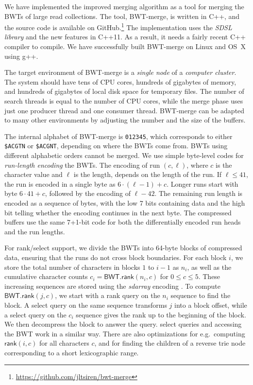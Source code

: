\documentclass[smallabstract,smallcaptions]{dccpaper}
\newcommand{\BWT}{\textsf{BWT}}
\newcommand{\mBWT}{\ensuremath{\mathsf{BWT}}}
\newcommand{\rank}{\textsf{rank}}
\newcommand{\select}{\textsf{select}}
\newcommand{\mrank}{\ensuremath{\mathsf{rank}}}
\newcommand{\BWTmerge}{\textsf{BWT\nobreakdash-merge}}
\begin{document}

We have implemented the improved merging algorithm as a tool for merging the \BWT{}s of large read collections. The tool, \BWTmerge{}, is written in C++, and the source code is available on GitHub.\footnote{\url{https://github.com/jltsiren/bwt-merge}} The implementation uses the \emph{SDSL library} \cite{Gog2014b} and the new features in C++11. As a result, it needs a fairly recent C++ compiler to compile. We have successfully built \BWTmerge{} on Linux and OS~X using g++.

The target environment of \BWTmerge{} is a \emph{single node} of a \emph{computer cluster}. The system should have tens of CPU cores, hundreds of gigabytes of memory, and hundreds of gigabytes of local disk space for temporary files. The number of search threads is equal to the number of CPU cores, while the merge phase uses just one producer thread and one consumer thread. \BWTmerge{} can be adapted to many other environments by adjusting the number and the size of the buffers.

The internal alphabet of \BWTmerge{} is \texttt{012345}, which corresponds to either \texttt{\$ACGTN} or \texttt{\$ACGNT}, depending on where the \BWT{}s come from. \BWT{}s using different alphabetic orders cannot be merged. We use simple byte-level codes for \emph{run-length encoding} the \BWT{}s. The encoding of run $(c, \ell)$, where $c$ is the character value and $\ell$ is the length, depends on the length of the run. If $\ell \le 41$, the run is encoded in a single byte as $6 \cdot (\ell-1) + c$. Longer runs start with byte $6 \cdot 41 + c$, followed by the encoding of $\ell-42$. The remaining run length is encoded as a sequence of bytes, with the low 7 bits containing data and the high bit telling whether the encoding continues in the next byte. The compressed buffers use the same 7+1\nobreakdash-bit code for both the differentially encoded run heads and the run lengths.

For \rank/\select{} support, we divide the \BWT{}s into 64\nobreakdash-byte blocks of compressed data, ensuring that the runs do not cross block boundaries. For each block $i$, we store the total number of characters in blocks $1$ to $i-1$ as $n_{i}$, as well as the cumulative character counts $c_{i} = \mBWT.\mrank(n_{i},c)$ for $0 \le c \le 5$. These increasing sequences are stored using the \emph{sdarray} encoding \cite{Okanohara2007}. To compute $\mBWT.\mrank(j,c)$, we start with a \rank{} query on the $n_{i}$ sequence to find the block. A \select{} query on the same sequence transforms $j$ into a block offset, while a \select{} query on the $c_{i}$ sequence gives the rank up to the beginning of the block. We then decompress the block to answer the query. \select{} queries and accessing the \BWT{} work in a similar way. There are also optimizations for e.g.~computing $\mrank(i,c)$ for all characters $c$, and for finding the children of a reverse trie node corresponding to a short lexicographic range.
\end{document}
